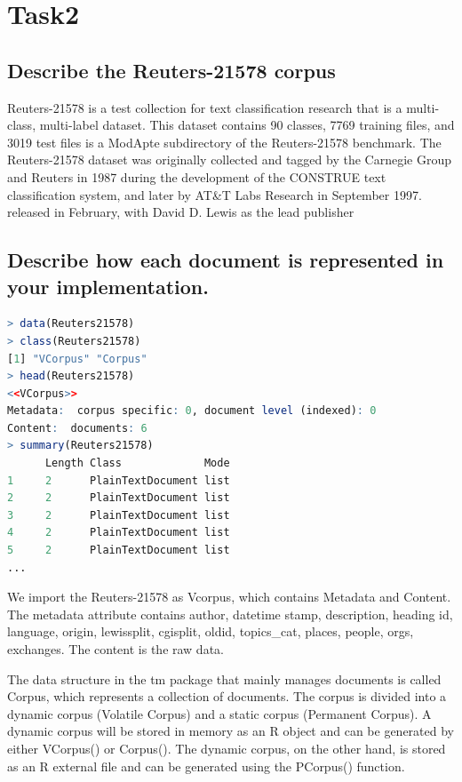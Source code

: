\documentclass{article}
\begin{document}
\section{Task2}
\subsection{Describe the Reuters-21578 corpus}
Reuters-21578 is a test collection for text classification research that is a multi-class, multi-label dataset. This dataset contains 90 classes, 7769 training files, and 3019 test files is a ModApte subdirectory of the Reuters-21578 benchmark. The Reuters-21578 dataset was originally collected and tagged by the Carnegie Group and Reuters in 1987 during the development of the CONSTRUE text classification system, and later by AT\&T Labs Research in September 1997. released in February, with David D. Lewis as the lead publisher

\subsection{Describe how each document is represented in your implementation.}
\begin{lstlisting}[language=R]
> data(Reuters21578)
> class(Reuters21578)
[1] "VCorpus" "Corpus" 
> head(Reuters21578)
<<VCorpus>>
Metadata:  corpus specific: 0, document level (indexed): 0
Content:  documents: 6
> summary(Reuters21578)
      Length Class             Mode
1     2      PlainTextDocument list
2     2      PlainTextDocument list
3     2      PlainTextDocument list
4     2      PlainTextDocument list
5     2      PlainTextDocument list
...
\end{lstlisting}

We import the Reuters-21578 as Vcorpus, which contains Metadata and Content. The metadata attribute contains author, datetime stamp, description, heading id, language, origin, lewissplit, cgisplit, oldid, topics\_cat, places, people, orgs, exchanges. The content is the raw data.

The data structure in the tm package that mainly manages documents is called Corpus, which represents a collection of documents. The corpus is divided into a dynamic corpus (Volatile Corpus) and a static corpus (Permanent Corpus). A dynamic corpus will be stored in memory as an R object and can be generated by either VCorpus() or Corpus(). The dynamic corpus, on the other hand, is stored as an R external file and can be generated using the PCorpus() function.
\end{document}
